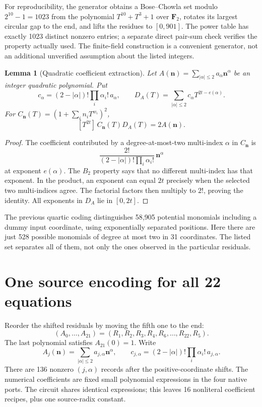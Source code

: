 \documentclass[11pt,letterpaper]{article}
\newtheorem{lemma}[theorem]{Lemma}
\theoremstyle{definition}\newtheorem{definition}[theorem]{Definition}
\theoremstyle{remark}\newtheorem{remark}[theorem]{Remark}
\begin{document}
For reproducibility, the generator obtains a Bose--Chowla set modulo $2^{10}-1=1023$ from the polynomial $T^{10}+T^3+1$ over $\mathbf F_2$, rotates its largest circular gap to the end, and lifts the residues to $[0,901]$. The power table has exactly 1023 distinct nonzero entries; a separate direct pair-sum check verifies the property actually used. The finite-field construction is a convenient generator, not an additional unverified assumption about the listed integers.

\begin{lemma}[Quadratic coefficient extraction]\label{lem:extraction}
Let $A(\mathbf n)=\sum_{|\alpha|\le2}a_\alpha\mathbf n^\alpha$ be an integer quadratic polynomial. Put
\[
 c_\alpha=(2-|\alpha|)!\prod_i\alpha_i!\,a_\alpha,
 \qquad
 D_A(T)=\sum_{|\alpha|\le2}c_\alpha T^{2t-e(\alpha)}.
\]
For $C_{\mathbf n}(T)=(1+\sum_i n_iT^{w_i})^2$,
\[
 [T^{2t}]\,C_{\mathbf n}(T)D_A(T)=2A(\mathbf n).
\]
\end{lemma}
\begin{proof}
The coefficient contributed by a degree-at-most-two multi-index $\alpha$ in $C_{\mathbf n}$ is
\[
 \frac{2!}{(2-|\alpha|)!\prod_i\alpha_i!}\,\mathbf n^\alpha
\]
at exponent $e(\alpha)$. The $B_2$ property says that no different multi-index has that exponent. In the product, an exponent can equal $2t$ precisely when the selected two multi-indices agree. The factorial factors then multiply to $2!$, proving the identity. All exponents in $D_A$ lie in $[0,2t]$.
\end{proof}

The previous quartic coding distinguishes 58,905 potential monomials including a dummy input coordinate, using exponentially separated positions. Here there are just 528 possible monomials of degree at most two in 31 coordinates. The listed set separates all of them, not only the ones observed in the particular residuals.

\section{One source encoding for all 22 equations}\label{sec:source}

Reorder the shifted residuals by moving the fifth one to the end:
\[
 (A_0,\ldots,A_{21})=(R_1,R_2,R_3,R_4,R_6,\ldots,R_{22},R_5).
\]
The last polynomial satisfies $A_{21}(0)=1$. Write
\[
 A_j(\mathbf n)=\sum_{|\alpha|\le2}a_{j,\alpha}\mathbf n^\alpha,
 \qquad c_{j,\alpha}=(2-|\alpha|)!\prod_i\alpha_i!\,a_{j,\alpha}.
\]
There are 136 nonzero $(j,\alpha)$ records after the positive-coordinate shifts. The numerical coefficients are fixed small polynomial expressions in the four native ports. The circuit shares identical expressions; this leaves 16 nonliteral coefficient recipes, plus one source-radix constant.
\end{document}

